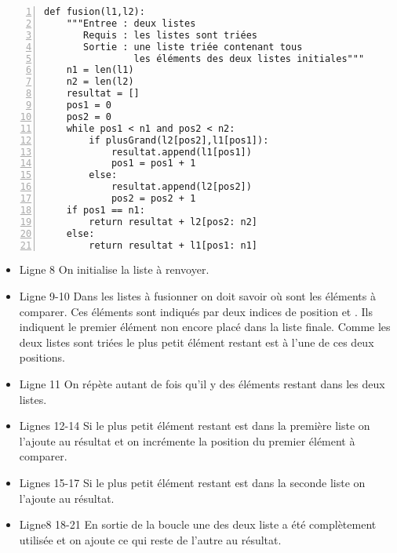 \begin{lstlisting}[numbers=left,caption = {Fusion de deux listes triées en une nouvelle liste},label={fn:fusion}]
def fusion(l1,l2):
    """Entree : deux listes
       Requis : les listes sont triées
       Sortie : une liste triée contenant tous 
                les éléments des deux listes initiales"""
    n1 = len(l1)
    n2 = len(l2)
    resultat = []
    pos1 = 0
    pos2 = 0
    while pos1 < n1 and pos2 < n2:
        if plusGrand(l2[pos2],l1[pos1]):
            resultat.append(l1[pos1])
            pos1 = pos1 + 1
        else:
            resultat.append(l2[pos2])
            pos2 = pos2 + 1
    if pos1 == n1:
        return resultat + l2[pos2: n2]
    else:
        return resultat + l1[pos1: n1]
\end{lstlisting}
\begin{itemize}
\item Ligne 8 On initialise la liste à renvoyer.
\item Ligne 9-10 Dans les listes à fusionner  on doit savoir où sont les éléments à comparer. Ces éléments sont indiqués par deux indices de position  et . Ils indiquent le premier élément non encore placé dans la liste finale. Comme les deux listes sont triées le plus petit élément restant est à l'une de ces deux positions.
\item Ligne 11 On répète autant de fois qu'il y des éléments restant dans les deux listes. 
\item Lignes 12-14 Si le plus petit élément restant est dans la première liste on  l'ajoute au résultat et on incrémente la position du premier élément à comparer.
\item Lignes 15-17 Si le plus petit élément restant est dans la seconde liste on  l'ajoute au résultat.
\item Ligne8 18-21 En sortie de la boucle une des deux liste a été complètement utilisée et on ajoute ce qui reste de l'autre au résultat.
\end{itemize}

